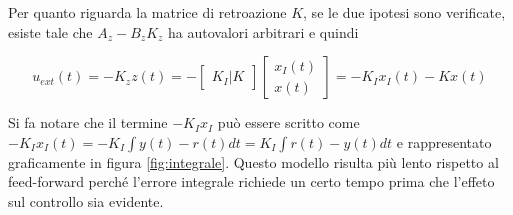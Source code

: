 		\noindent Per quanto riguarda la matrice di retroazione $K$, se le due ipotesi sono verificate, esiste tale che $A_z-B_zK_z$ ha autovalori arbitrari e quindi
		
		\begin{equation}
			u_{ext}(t)=-K_zz(t)=-
			\begin{bmatrix}
				K_I | K
			\end{bmatrix}
			\begin{bmatrix}
				x_I(t) \\
				x(t)
			\end{bmatrix}
			=-K_Ix_I(t)-Kx(t)
		\end{equation}
	
		\noindent Si fa notare che il termine $-K_Ix_I$ può essere scritto come $-K_Ix_I(t)=-K_I\int y(t)-r(t)dt=K_I\int r(t)-y(t)dt$ e rappresentato graficamente in figura \ref{fig:integrale}. 
		\newline  Questo modello risulta più lento rispetto al feed-forward perché l'errore integrale richiede un certo tempo prima che l'effeto sul controllo sia evidente.  
	
	
	
	
	
	
	
	
	
	
	
	
	
	
	
	
	
	
	
	
	
	
	
	
			